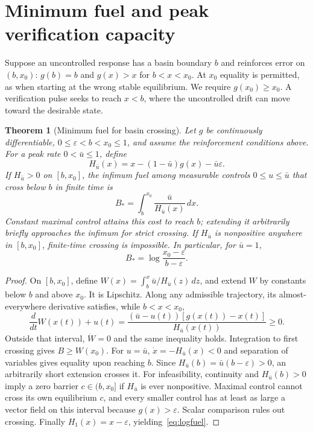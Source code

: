 \documentclass[11pt]{article}
\newtheorem{theorem}{Theorem}
\theoremstyle{remark}\newtheorem{remark}[theorem]{Remark}
\newcommand{\eps}{\varepsilon}
\begin{document}
\section{Minimum fuel and peak verification capacity}
\label{sec:fuel}
Suppose an uncontrolled response has a basin boundary $b$ and reinforces error on $(b,x_0)$: $g(b)=b$ and $g(x)>x$ for $b<x<x_0$. At $x_0$ equality is permitted, as when starting at the wrong stable equilibrium. We require $g(x_0)\ge x_0$. A verification pulse seeks to reach $x<b$, where the uncontrolled drift can move toward the desirable state.

\begin{theorem}[Minimum fuel for basin crossing]
\label{thm:fuel}
Let $g$ be continuously differentiable, $0\le\eps<b<x_0\le1$, and assume the reinforcement conditions above. For a peak rate $0<\bar u\le1$, define
\begin{equation}
 H_{\bar u}(x)=x-(1-\bar u)g(x)-\bar u\eps.
 \label{eq:H}
\end{equation}
If $H_{\bar u}>0$ on $[b,x_0]$, the infimum fuel among measurable controls $0\le u\le\bar u$ that cross below $b$ in finite time is
\begin{equation}
 B_* =\int_b^{x_0}\frac{\bar u}{H_{\bar u}(x)}\,dx.
 \label{eq:fuel}
\end{equation}
Constant maximal control attains this cost to reach $b$; extending it arbitrarily briefly approaches the infimum for strict crossing. If $H_{\bar u}$ is nonpositive anywhere in $[b,x_0]$, finite-time crossing is impossible. In particular, for $\bar u=1$,
\begin{equation}
 B_*=\log\frac{x_0-\eps}{b-\eps}.
 \label{eq:logfuel}
\end{equation}
\end{theorem}

\begin{proof}
On $[b,x_0]$, define $W(x)=\int_b^x \bar u/H_{\bar u}(z)\,dz$, and extend $W$ by constants below $b$ and above $x_0$. It is Lipschitz. Along any admissible trajectory, its almost-everywhere derivative satisfies, while $b<x<x_0$,
\begin{equation}
 \frac{d}{dt}W(x(t))+u(t)
 =\frac{(\bar u-u(t))[g(x(t))-x(t)]}{H_{\bar u}(x(t))}\ge0.
 \label{eq:verificationidentity}
\end{equation}
Outside that interval, $\dot W=0$ and the same inequality holds. Integration to first crossing gives $B\ge W(x_0)$. For $u=\bar u$, $\dot x=-H_{\bar u}(x)<0$ and separation of variables gives equality upon reaching $b$. Since $H_{\bar u}(b)=\bar u(b-\eps)>0$, an arbitrarily short extension crosses it. For infeasibility, continuity and $H_{\bar u}(b)>0$ imply a zero barrier $c\in(b,x_0]$ if $H_{\bar u}$ is ever nonpositive. Maximal control cannot cross its own equilibrium $c$, and every smaller control has at least as large a vector field on this interval because $g(x)>\eps$. Scalar comparison rules out crossing. Finally $H_1(x)=x-\eps$, yielding~\eqref{eq:logfuel}.
\end{proof}
\end{document}
